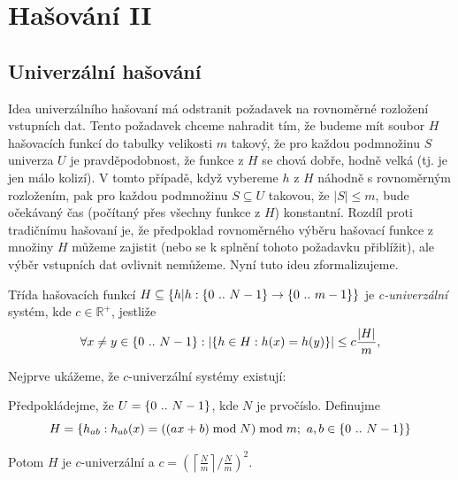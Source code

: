 
\chapter{Hašování II}

\section{Univerzální hašování}

Idea univerzálního hašovaní má odstranit požadavek na rovnoměrné 
rozložení vstupních dat. Tento požadavek chceme nahradit tím, že 
budeme mít soubor $H$ hašovacích funkcí do tabulky velikosti $m$ takový,
že pro každou podmnožinu $S$ univerza $U$ je pravděpodobnost, že funkce z 
$H$ se chová dobře, hodně velká (tj. je jen málo kolizí). V tomto případě, 
když vybereme $h$ z $H$ náhodně s rovnoměrným rozložením, pak pro každou 
podmnožinu $S\subseteq U$ takovou, že $|S|\leq m$, bude očekávaný čas 
(počítaný přes všechny funkce z $H$) konstantní. Rozdíl proti tradičnímu 
hašovaní je, že předpoklad rovnoměrného výběru hašovací funkce z množiny 
$H$ můžeme zajistit (nebo se k splnění tohoto požadavku přiblížit), ale 
výběr vstupních dat ovlivnit nemůžeme. Nyní tuto ideu zformalizujeme. 

\begin{defn}
\label{c-us}
Třída hašovacích funkcí 
\( H \subseteq \{h | h: \{{0}\ ..\ {N-1}\} \rightarrow \{{0}\ ..\ {m-1}\}\} \)
je \emph{c-univerzální} systém, kde $c\in\mathbb{R}^+$, jestliže 
\begin{equation*}
\forall x\neq y\in \{{0}\ ..\ {N-1}\} :
\left |\{h\in H : h(x)=h(y)\}\right| \leq c\frac{|H|}{m}, 
\end{equation*}
\end{defn}



\noindent
Nejprve ukážeme, že $c$-univerzální systémy existují:

\begin{theorem}
Předpokládejme, že $U = \{{0}\ ..\ {N-1}\}$, kde $N$ je prvočíslo.
Definujme 
\[ H=\{h_{ab}:h_{ab}(x)=((ax+b)\bmod N)\bmod m;
\ a,b\in \{{0}\ ..\ {N-1}\}\} \]

Potom $H$ je \( c \)-univerzální a 
\( c=\left( \left\lceil \frac{N}{m}\right\rceil /\frac{N}{m}\right) ^{2} \).
\end{theorem}

